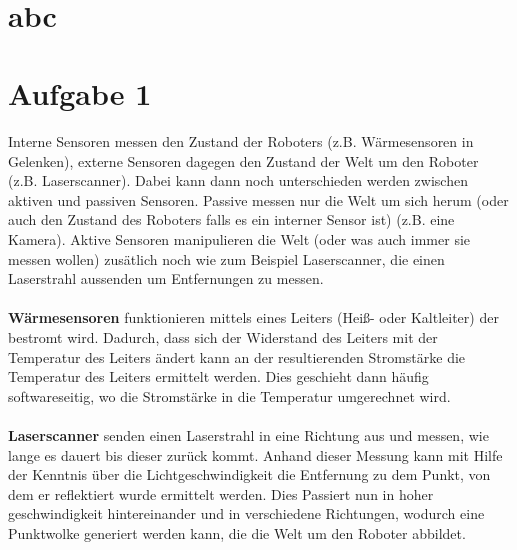 \documentclass{../Vorlage/mat}
\begin{document}
 \\

\tableofcontents
\clearpage

\section{abc}



\section*{Aufgabe 1}
Interne Sensoren messen den Zustand der Roboters (z.B. Wärmesensoren in Gelenken), externe Sensoren dagegen den Zustand der Welt um den Roboter (z.B. Laserscanner). Dabei kann dann noch unterschieden werden zwischen aktiven und passiven Sensoren. Passive messen nur die Welt um sich herum (oder auch den Zustand des Roboters falls es ein interner Sensor ist) (z.B. eine Kamera). Aktive Sensoren manipulieren die Welt (oder was auch immer sie messen wollen) zusätlich noch wie zum Beispiel Laserscanner, die einen Laserstrahl aussenden um Entfernungen zu messen.\\
\\
\textbf{Wärmesensoren} funktionieren mittels eines Leiters (Heiß- oder Kaltleiter) der bestromt wird. Dadurch, dass sich der Widerstand des Leiters mit der Temperatur des Leiters ändert kann an der resultierenden Stromstärke die Temperatur des Leiters ermittelt werden. Dies geschieht dann häufig softwareseitig, wo die Stromstärke in die Temperatur umgerechnet wird.\\
\\
\textbf{Laserscanner} senden einen Laserstrahl in eine Richtung aus und messen, wie lange es dauert bis dieser zurück kommt. Anhand dieser Messung kann mit Hilfe der Kenntnis über die Lichtgeschwindigkeit die Entfernung zu dem Punkt, von dem er reflektiert wurde ermittelt werden. Dies Passiert nun in hoher geschwindigkeit hintereinander und in verschiedene Richtungen, wodurch eine Punktwolke generiert werden kann, die die Welt um den Roboter abbildet.
\end{document}
